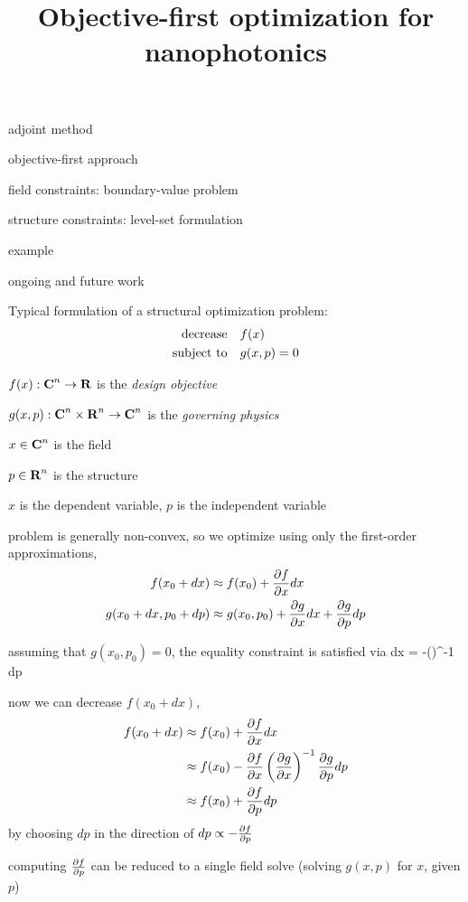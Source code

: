\documentclass[landscape]{foils}
\title{Objective-first optimization for nanophotonics}
\author{}
\date{}
\renewcommand{\oursection}[1]{
\foilhead[-1.0cm]{#1}
}
\begin{document}
\setlength{\parskip}{0cm}
\maketitle

\BIT \itemsep -1pt
\item adjoint method
\item objective-first approach
\item field constraints: boundary-value problem
\item structure constraints: level-set formulation
\item example
\item ongoing and future work
\EIT

\vfill

\oursection{Adjoint method}
Typical formulation of a structural optimization problem:
\begin{align}
\mbox{decrease} & \quad f(x) \\
\mbox{subject to} & \quad g(x,p) = 0
\end{align}
\BIT
\item $f(x): {\mbox{\bf C}}^n \to {\mbox{\bf R}}$ is the \emph{design objective}
\item $g(x,p): {\mbox{\bf C}}^n \times {\mbox{\bf R}}^n \to {\mbox{\bf C}}^n$ is the \emph{governing physics}
\item $x \in {\mbox{\bf C}}^n$ is the field 
\item $p \in {\mbox{\bf R}}^n$ is the structure 
\item $x$ is the dependent variable, $p$ is the independent variable
\EIT
\newpage

\BIT
\item problem is generally non-convex, so we optimize using only the first-order approximations,
\begin{align}
f(x_0+dx) & \approx f(x_0) + \frac{\partial f}{\partial x} dx \\
g(x_0+dx,p_0+dp) & \approx g(x_0,p_0) + \frac{\partial g}{\partial x} dx + \frac{\partial g}{\partial p} dp
\end{align}
\item assuming that $g(x_0,p_0) = 0$, the equality constraint is satisfied via
    \BEQ  dx = -\left(\right)^{-1}  dp \EEQ
\EIT
\newpage

\BIT
\item now we can decrease $f(x_0+dx)$,
    \begin{align} 
    f(x_0+dx) & \approx f(x_0) + \frac{\partial f}{\partial x} dx \\
        & \approx f(x_0) - \frac{\partial f}{\partial x} \left(\frac{\partial g}{\partial x}\right)^{-1} \frac{\partial g}{\partial p} dp \\
        & \approx f(x_0) + \frac{\partial f}{\partial p} dp
    \end{align}
    by choosing $dp$ in the direction of $dp \propto -\frac{\partial f}{\partial p}$
\item computing $\frac{\partial f}{\partial p}$ can be reduced to a single field solve (\ie solving $g(x,p)$ for $x$, given $p$)
\EIT
\newpage
\end{document}
